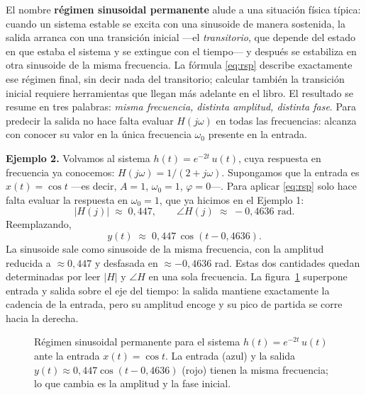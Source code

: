 \documentclass[class=book, crop=false]{standalone}
\begin{document}
El nombre \textbf{régimen sinusoidal permanente} alude a una situación física típica: cuando un sistema estable se excita con una sinusoide de manera sostenida, la salida arranca con una transición inicial ---el \emph{transitorio}, que depende del estado en que estaba el sistema y se extingue con el tiempo--- y después se estabiliza en otra sinusoide de la misma frecuencia. La fórmula \eqref{eq:rsp} describe exactamente ese régimen final, sin decir nada del transitorio; calcular también la transición inicial requiere herramientas que llegan más adelante en el libro. El resultado se resume en tres palabras: \emph{misma frecuencia, distinta amplitud, distinta fase}. Para predecir la salida no hace falta evaluar $H(j\omega)$ en todas las frecuencias: alcanza con conocer su valor en la única frecuencia $\omega_0$ presente en la entrada.

\medskip
\textbf{Ejemplo 2.}
Volvamos al sistema $h(t) = e^{-2t}\,u(t)$, cuya respuesta en frecuencia ya conocemos: $H(j\omega) = 1/(2 + j\omega)$. Supongamos que la entrada es $x(t) = \cos t$ ---es decir, $A = 1$, $\omega_0 = 1$, $\varphi = 0$---. Para aplicar \eqref{eq:rsp} solo hace falta evaluar la respuesta en $\omega_0 = 1$, que ya hicimos en el Ejemplo 1:
\begin{equation*}
    |H(j)| \;\approx\; 0{,}447, \qquad \angle H(j) \;\approx\; -0{,}4636 \text{ rad}.
\end{equation*}
Reemplazando,
\begin{equation*}
    y(t) \;\approx\; 0{,}447\,\cos(t - 0{,}4636).
\end{equation*}
La sinusoide sale como sinusoide de la misma frecuencia, con la amplitud reducida a $\approx 0{,}447$ y desfasada en $\approx -0{,}4636$ rad. Estas dos cantidades quedan determinadas por leer $|H|$ y $\angle H$ en una sola frecuencia. La figura~\ref{fig:rsp_ejemplo} superpone entrada y salida sobre el eje del tiempo: la salida mantiene exactamente la cadencia de la entrada, pero su amplitud encoge y su pico de partida se corre hacia la derecha.

\begin{figure}[H]
    \centering
    \begin{minipage}{\linewidth}
        \centering
        
        \caption{Régimen sinusoidal permanente para el sistema $h(t) = e^{-2t}\,u(t)$ ante la entrada $x(t) = \cos t$. La entrada (azul) y la salida $y(t) \approx 0{,}447\cos(t - 0{,}4636)$ (rojo) tienen la misma frecuencia; lo que cambia es la amplitud y la fase inicial.}
        \label{fig:rsp_ejemplo}
    \end{minipage}
\end{figure}
\end{document}
